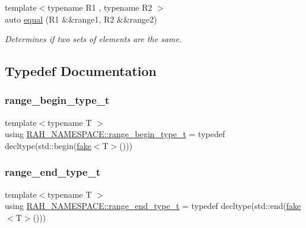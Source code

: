 \begin{DoxyCompactItemize}
{\footnotesize template$<$typename R1 , typename R2 $>$ }\\auto \mbox{\hyperlink{namespace_r_a_h___n_a_m_e_s_p_a_c_e_a0ecf925d702d4b5f9c35c7094b0a7436}{equal}} (R1 \&\&range1, R2 \&\&range2)
\begin{DoxyCompactList}\small\item\em Determines if two sets of elements are the same. \end{DoxyCompactList}\end{DoxyCompactItemize}


\subsection{Typedef Documentation}
\mbox{\label{namespace_r_a_h___n_a_m_e_s_p_a_c_e_a46705781d6869d5151141f871ced1e9c}} 
\subsubsection{\texorpdfstring{range\_begin\_type\_t}{range\_begin\_type\_t}}
{\footnotesize\ttfamily template$<$typename T $>$ \\
using \mbox{\hyperlink{namespace_r_a_h___n_a_m_e_s_p_a_c_e_a46705781d6869d5151141f871ced1e9c}{R\+A\+H\+\_\+\+N\+A\+M\+E\+S\+P\+A\+C\+E\+::range\+\_\+begin\+\_\+type\+\_\+t}} = typedef decltype(std\+::begin(\mbox{\hyperlink{namespace_r_a_h___n_a_m_e_s_p_a_c_e_a23011f56a88d50b186adcd2ba96daecd}{fake}}$<$T$>$()))}

\mbox{\label{namespace_r_a_h___n_a_m_e_s_p_a_c_e_aadeb8c12d454f4cc70bf80766871d3b2}} 
\subsubsection{\texorpdfstring{range\_end\_type\_t}{range\_end\_type\_t}}
{\footnotesize\ttfamily template$<$typename T $>$ \\
using \mbox{\hyperlink{namespace_r_a_h___n_a_m_e_s_p_a_c_e_aadeb8c12d454f4cc70bf80766871d3b2}{R\+A\+H\+\_\+\+N\+A\+M\+E\+S\+P\+A\+C\+E\+::range\+\_\+end\+\_\+type\+\_\+t}} = typedef decltype(std\+::end(\mbox{\hyperlink{namespace_r_a_h___n_a_m_e_s_p_a_c_e_a23011f56a88d50b186adcd2ba96daecd}{fake}}$<$T$>$()))}

